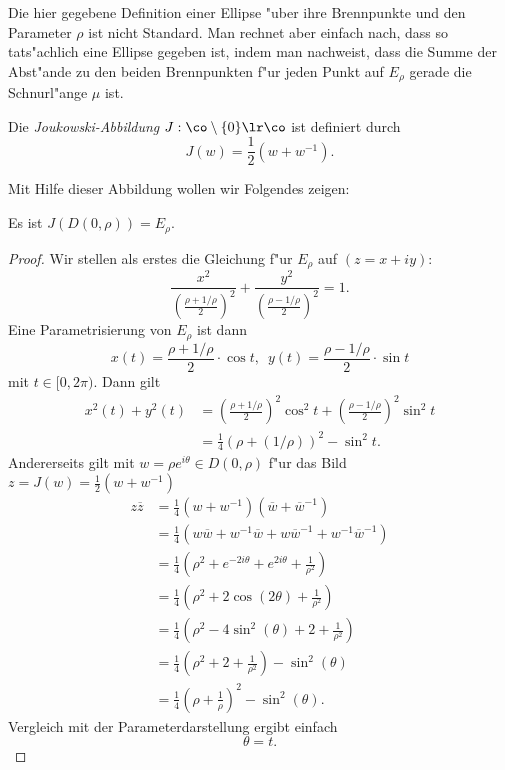 Die hier gegebene Definition einer Ellipse "uber ihre Brennpunkte und den Parameter $\rho$
ist nicht Standard. Man rechnet aber einfach nach, dass so tats"achlich eine Ellipse 
gegeben ist, indem man nachweist, dass die Summe der Abst"ande zu den beiden Brennpunkten
f"ur jeden Punkt auf $E_\rho$ gerade die Schnurl"ange $\mu$ ist. 

\begin{defn}
Die \emph{Joukowski-Abbildung} $J:\co \setminus \{0\} \lr \co$ ist definiert durch
\[
J(w) = \frac{1}{2}(w+w^{-1}).
\]
\end{defn}

Mit Hilfe dieser Abbildung wollen wir Folgendes zeigen:

\begin{lem} Es ist
$J(D(0,\rho)) = E_{\rho}$. 
\end{lem}
\begin{proof}
Wir stellen als erstes die Gleichung f"ur $E_{\rho}$ auf $(z = x + iy)$:
\[
\frac{x^2}{\left(\frac{\rho+1/\rho}{2}\right)^2} + \frac{y^2}{\left(\frac{\rho-1/\rho}{2}\right)^2} = 1.
\]
Eine Parametrisierung von $E_{\rho}$ ist dann
\[
x(t) = \frac{\rho+1/\rho}{2} \cdot \cos t, \enspace 
y(t) = \frac{\rho-1/\rho}{2} \cdot \sin t
\]
mit $t \in [0, 2\pi)$. Dann gilt
\begin{align*}
x^2(t)+y^2(t)&=\left(\frac{\rho+1/\rho}{2}\right)^2 \cos^2 t + \left(\frac{\rho-1/\rho}{2}\right)^2 \sin^2 t \\
&=\frac{1}{4}\left(\rho+(1/\rho)\right)^2 - \sin^2 t.
\end{align*}
Andererseits gilt mit $w=\rho e^{i\theta} \in D(0,\rho)$ f"ur das Bild
$z=J(w)=\frac{1}{2}(w+w^{-1})$
\begin{align*}
z \overline{z} &= \frac{1}{4} (w+w^{-1})(\overline{w}+\overline{w}^{-1}) \\
&= \frac{1}{4}(w \overline{w} + w^{-1} \overline{w} + w \overline{w}^{-1} + w^{-1}\overline{w}^{-1}) \\
&= \frac{1}{4}\left(\rho^2 + e^{-2i \theta} + e^{2i\theta} + \frac{1}{\rho^2}\right) \\
&= \frac{1}{4}\left(\rho^2 + 2 \cos(2\theta) + \frac{1}{\rho^2}\right) \\
&= \frac{1}{4}\left(\rho^2 - 4 \sin^2(\theta) + 2 + \frac{1}{\rho^2}\right) \\
&= \frac{1}{4}\left(\rho^2 + 2 + \frac{1}{\rho^2}\right) - \sin^2(\theta) \\
&= \frac{1}{4}\left(\rho + \frac{1}{\rho}\right)^2 - \sin^2(\theta). 
\end{align*}
Vergleich mit der Parameterdarstellung ergibt einfach 
\[
\theta = t.
\]
\end{proof}

